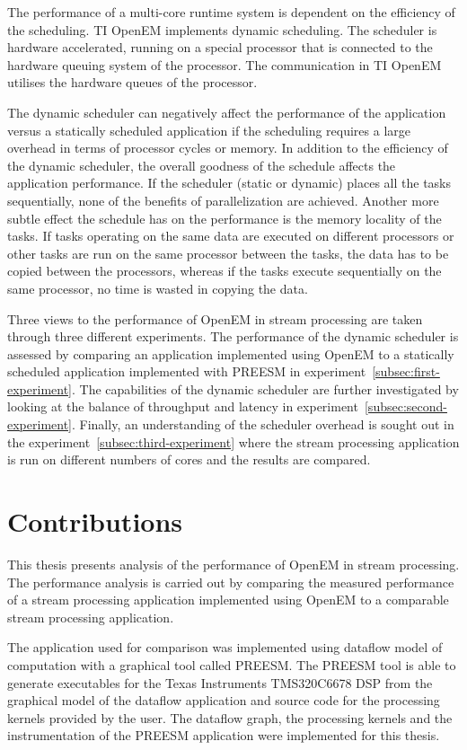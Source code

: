 The performance of a multi-core runtime system is dependent on the efficiency of the scheduling. TI OpenEM implements dynamic scheduling. The scheduler is hardware accelerated, running on a special processor that is connected to the hardware queuing system of the processor. The communication in TI OpenEM utilises the hardware queues of the processor.

The dynamic scheduler can negatively affect the performance of the application versus a statically scheduled application if the scheduling requires a large overhead in terms of processor cycles or memory. In addition to the efficiency of the dynamic scheduler, the overall goodness of the schedule affects the application performance. If the scheduler (static or dynamic) places all the tasks sequentially, none of the benefits of parallelization are achieved. Another more subtle effect the schedule has on the performance is the memory locality of the tasks. If tasks operating on the same data are executed on different processors or other tasks are run on the same processor between the tasks, the data has to be copied between the processors, whereas if the tasks execute sequentially on the same processor, no time is wasted in copying the data.

Three views to the performance of OpenEM in stream processing are taken through three different experiments. The performance of the dynamic scheduler is assessed by comparing an application implemented using OpenEM to a statically scheduled application implemented with PREESM in experiment~\ref{subsec:first-experiment}. The capabilities of the dynamic scheduler are further investigated by looking at the balance of throughput and latency in experiment~\ref{subsec:second-experiment}. Finally, an understanding of the scheduler overhead is sought out in the experiment~\ref{subsec:third-experiment} where the stream processing application is run on different numbers of cores and the results are compared.

\section{Contributions}
\label{section:contributions}
This thesis presents analysis of the performance of OpenEM in stream processing. The performance analysis is carried out by comparing the measured performance of a stream processing application implemented using OpenEM to a comparable stream processing application.

The application used for comparison was implemented using dataflow model of computation with a graphical tool called PREESM. The PREESM tool is able to generate executables for the Texas Instruments TMS320C6678 DSP from the graphical model of the dataflow application and source code for the processing kernels provided by the user. The dataflow graph, the processing kernels and the instrumentation of the PREESM application were implemented for this thesis.

